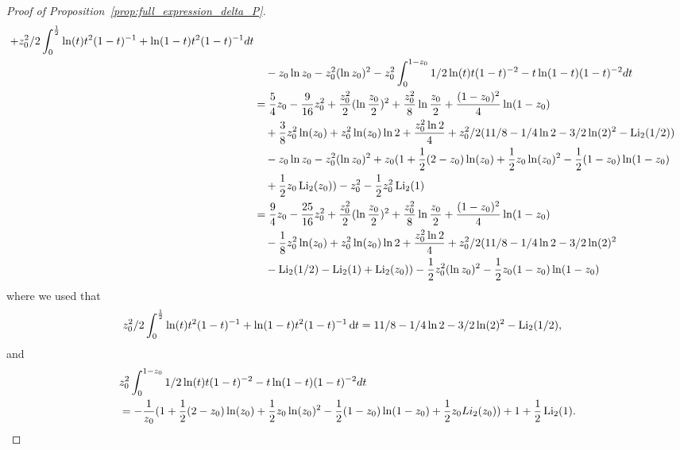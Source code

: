 \begin{proof}[Proof of Proposition~\ref{prop:full_expression_delta_P}]
\begin{align*}
		+z_0^2/2\int_0^{\frac{1}{2}} \ln(t)t^2(1-t)^{-1}+\ln(1-t)t^2(1-t)^{-1}dt \\
	&\hspace{10pt}-z_0 \ln z_0-z_0^2(\ln z_0)^2-z_0^2\int_0^{1-z_0} 1/2\ln(t)t(1-t)^{-2}-t\ln(1-t)(1-t)^{-2}dt \\
	&=\frac{5}{4}z_0-\frac{9}{16}z_0^2 +\frac{z_0^2}{2}(\ln\frac{z_0}{2})^2+\frac{z_0^2}{8}\ln\frac{z_0}{2} 
		+\frac{(1-z_0)^2}{4}\ln(1-z_0) \\
	&\hspace{10pt}+\frac{3}{8}z_0^2\ln(z_0)+z_0^2\ln(z_0)\ln 2+\frac{z_0^2 \ln2}{4}
		+z_0^2/2(11/8 -1/4 \ln 2 -3/2\ln(2)^2 -  \operatorname{Li}_2(1/2)) \\
	&\hspace{10pt}-z_0 \ln z_0-z_0^2(\ln z_0)^2+z_0(1 + \frac{1}{2}(2-z_0) \ln(z_0) 
		+ \frac{1}{2}z_0 \ln(z_0)^2 - \frac{1}{2} (1-z_0) \ln(1-z_0) \\
	&\hspace{10pt}+\frac{1}{2}z_0 \operatorname{Li}_2(z_0)) - z_0^2   -\frac{1}{2}  z_0^2\operatorname{Li}_2(1) \\
	&=\frac{9}{4}z_0-\frac{25}{16}z_0^2 +\frac{z_0^2}{2}(\ln\frac{z_0}{2})^2+\frac{z_0^2}{8}\ln\frac{z_0}{2} 
		+\frac{(1-z_0)^2}{4}\ln(1-z_0) \\
	&\hspace{10pt}-\frac{1}{8}z_0^2\ln(z_0)+z_0^2\ln(z_0)\ln 2+\frac{z_0^2 \ln2}{4}
		+z_0^2/2(11/8 -1/4 \ln 2 -3/2\ln(2)^2 \\
	&\hspace{10pt}- \operatorname{Li}_2(1/2)-\operatorname{Li}_2(1)+\operatorname{Li}_2(z_0)) -\frac{1}{2}z_0^2(\ln z_0)^2 - \frac{1}{2} z_0(1-z_0) \ln(1-z_0)
\end{align*}
where we used that
\begin{align*}
	z_0^2/2\int_0^{\frac{1}{2}} \ln(t)t^2(1-t)^{-1}+\ln(1-t)t^2(1-t)^{-1} \operatorname{\mathrm{d}\hspace{-2pt}} t
	&= 11/8 -1/4 \ln 2 -3/2\ln(2)^2 -  \operatorname{Li}_2(1/2),
\end{align*}
and
\begin{align*}
	&z_0^2\int_0^{1-z_0} 1/2\ln(t)t(1-t)^{-2}-t\ln(1-t)(1-t)^{-2}dt\\
	&= -\frac{1}{z_0} (1 + \frac{1}{2}(2-z_0) \ln(z_0) + \frac{1}{2}z_0 \ln(z_0)^2 - \frac{1}{2} (1-z_0) \ln(1-z_0) +\frac{1}{2}z_0 Li_2(z_0))+1   +\frac{1}{2}  \operatorname{Li}_2(1).
\end{align*}

\end{proof}
